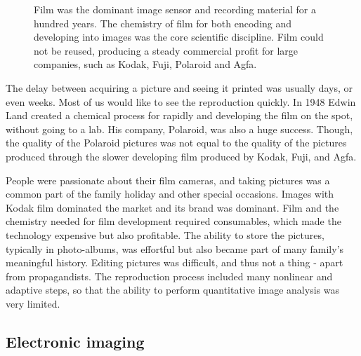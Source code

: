 \documentclass[
  letterpaper,
]{book}
\begin{document}
\begin{figure}


\caption{\label{fig-film}Film was the dominant image sensor and
recording material for a hundred years. The chemistry of film for both
encoding and developing into images was the core scientific discipline.
Film could not be reused, producing a steady commercial profit for large
companies, such as Kodak, Fuji, Polaroid and Agfa.}

\end{figure}%

The delay between acquiring a picture and seeing it printed was usually
days, or even weeks. Most of us would like to see the reproduction
quickly. In 1948 Edwin Land created a chemical process for rapidly and
developing the film on the spot, without going to a lab. His company,
Polaroid, was also a huge success. Though, the quality of the Polaroid
pictures was not equal to the quality of the pictures produced through
the slower developing film produced by Kodak, Fuji, and Agfa.

People were passionate about their film cameras, and taking pictures was
a common part of the family holiday and other special occasions. Images
with Kodak film dominated the market and its brand was dominant. Film
and the chemistry needed for film development required consumables,
which made the technology expensive but also profitable. The ability to
store the pictures, typically in photo-albums, was effortful but also
became part of many family's meaningful history. Editing pictures was
difficult, and thus not a thing - apart from propagandists. The
reproduction process included many nonlinear and adaptive steps, so that
the ability to perform quantitative image analysis was very limited.

\subsection{Electronic imaging}\label{electronic-imaging}
\end{document}
